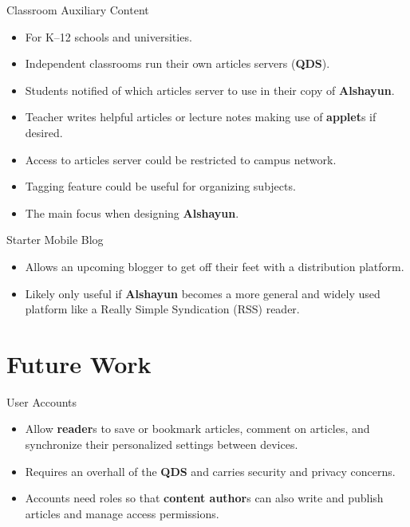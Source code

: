 \documentclass{beamer}
\begin{document}
\begin{frame}{Classroom Auxiliary Content}
    \begin{itemize}
        \item For K--12 schools and universities.
        \item Independent classrooms run their own articles servers
            (\textbf{QDS}).
        \item Students notified of which articles server to use in their copy of
            \textbf{Alshayun}.
        \item Teacher writes helpful articles or lecture notes making use of
            \textbf{applet}s if desired.
        \item Access to articles server could be restricted to campus network.
        \item Tagging feature could be useful for organizing subjects.
        \item The main focus when designing \textbf{Alshayun}.
    \end{itemize}
\end{frame}

\begin{frame}{Starter Mobile Blog}
    \begin{itemize}
        \item Allows an upcoming blogger to get off their feet with a
            distribution platform.
        \item Likely only useful if \textbf{Alshayun} becomes a more general and
            widely used platform like a Really Simple Syndication (RSS) reader.
    \end{itemize}
\end{frame}

\section{Future Work}

\begin{frame}{User Accounts}
    \begin{itemize}
        \item Allow \textbf{reader}s to save or bookmark articles, comment on
            articles, and synchronize their personalized settings between
            devices.
        \item Requires an overhall of the \textbf{QDS} and carries security and
            privacy concerns.
        \item Accounts need roles so that \textbf{content author}s can also
            write and publish articles and manage access permissions.
    \end{itemize}
\end{frame}
\end{document}
